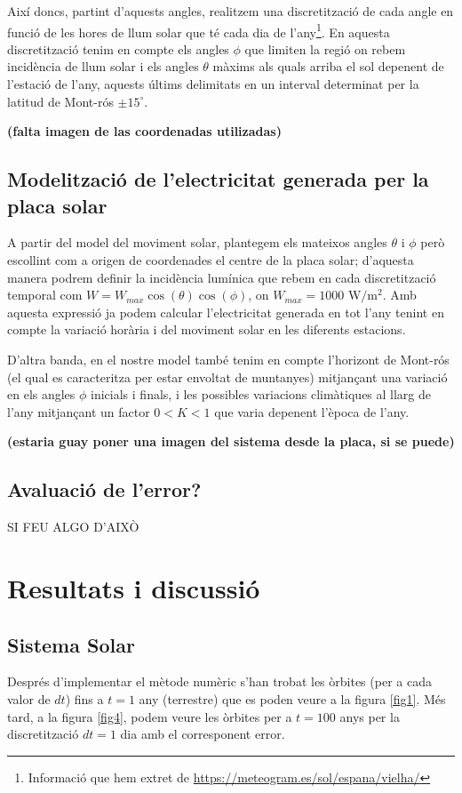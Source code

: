 \documentclass[10pt, twoside, a4paper]{article}
\begin{document}
Així doncs, partint d'aquests angles, realitzem una discretització de cada angle en funció de les hores de llum solar que té cada dia de l'any\footnote{Informació que hem extret de \url{https://meteogram.es/sol/espana/vielha/}}. En aquesta discretització tenim en compte els angles $\phi$ que limiten la regió on rebem incidència de llum solar i els angles $\theta$ màxims als quals arriba el sol depenent de l'estació de l'any, aquests últims delimitats en un interval determinat per la latitud de Mont-rós $\pm 15^\circ$.

\textbf{(falta imagen de las coordenadas utilizadas)}

\subsection{Modelització de l'electricitat generada per la placa solar}
A partir del model del moviment solar, plantegem els mateixos angles $\theta$ i $\phi$ però escollint com a origen de coordenades el centre de la placa solar; d'aquesta manera podrem definir la incidència lumínica que rebem en cada discretització temporal com $W = W_{max}\cos(\theta)\cos(\phi)$, on $W_{max} = 1000 \text{ W/m$^2$}$. Amb aquesta expressió ja podem calcular l'electricitat generada en tot l'any tenint en compte la variació horària i del moviment solar en les diferents estacions.

D'altra banda, en el nostre model també tenim en compte l'horizont de Mont-rós (el qual es caracteritza per estar envoltat de muntanyes) mitjançant una variació en els angles $\phi$ inicials i finals, i les possibles variacions climàtiques al llarg de l'any mitjançant un factor $0<K<1$ que varia depenent l'època de l'any.

\textbf{(estaria guay poner una imagen del sistema desde la placa, si se puede)}

\subsection{Avaluació de l'error?}
SI FEU ALGO D'AIXÒ

\section{Resultats i discussió}

\subsection{Sistema Solar}
Després d'implementar el mètode numèric s'han trobat les òrbites (per a cada valor de $dt$) fins a $t=1$ any (terrestre) que es poden veure a la figura \ref{fig1}. Més tard, a la figura \ref{fig4}, podem veure les òrbites per a $t=100$ anys per la discretització $dt=1$ dia amb el corresponent error.
 
\end{document}
